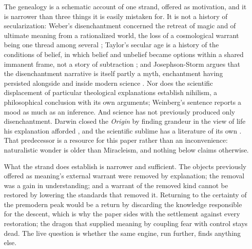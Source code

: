 The genealogy is a schematic account of one strand, offered as motivation, and
it is narrower than three things it is easily mistaken for. It is not a
history of secularization: Weber's disenchantment concerned the retreat of
magic and of ultimate meaning from a rationalized world, the loss of a
cosmological warrant being one thread among several \cite{Weber1919};
Taylor's secular age is a history of the conditions of belief, in which belief
and unbelief became options within a shared immanent frame, not a story of
subtraction \cite{Taylor07}; and Josephson-Storm argues that the
disenchantment narrative is itself partly a myth, enchantment having persisted
alongside and inside modern science \cite{JosephsonStorm17}. Nor does the scientific
displacement of particular theological explanations establish nihilism, a
philosophical conclusion with its own arguments; Weinberg's sentence reports a
mood as much as an inference. And science has
not previously produced only disenchantment. Darwin closed the \emph{Origin}
by finding grandeur in the view of life his explanation afforded
\cite{Darwin1859}, and the scientific sublime has a literature of its own
\cite{Gross18}. That predecessor is a resource for this paper rather than an
inconvenience: naturalistic wonder is older than Miracleism, and nothing below
claims otherwise.

What the strand does establish is narrower and sufficient. The objects
previously offered as meaning's external warrant were removed by explanation;
the removal was a gain in understanding; and a warrant of the removed kind
cannot be restored by lowering the standards that removed it. Returning to the
certainty of the premodern peak would be a return by discarding the knowledge
responsible for the descent, which is why the paper sides with the settlement
against every restoration; the dragon that supplied meaning by coupling fear
with control stays dead. The live question is whether the same engine, run
further, finds anything else.

